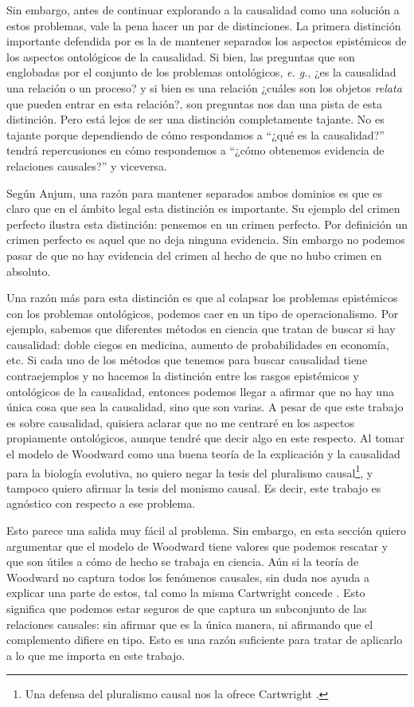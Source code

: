 Sin embargo, antes de continuar explorando a la causalidad como una solución a estos problemas, vale la pena hacer un par de distinciones. La primera distinción importante defendida por \cite{Anjum2018} es la de mantener separados los aspectos epistémicos de los aspectos ontológicos de la causalidad. Si bien, las preguntas que son englobadas por el conjunto de los problemas ontológicos, \textit{e. g.}, ¿es la causalidad una relación o un proceso? y si bien es una relación ¿cuáles son los objetos \textit{relata} que pueden entrar en esta relación?, son preguntas nos dan una pista de esta distinción. Pero está lejos de ser una distinción completamente tajante. No es tajante porque dependiendo de cómo respondamos a ``¿qué es la causalidad?'' tendrá repercusiones en cómo respondemos a ``¿cómo obtenemos evidencia de relaciones causales?'' y viceversa.

Según Anjum, una razón para mantener separados ambos dominios es que es claro que en el ámbito legal esta distinción es importante. Su ejemplo del crimen perfecto ilustra esta distinción: pensemos en un crimen perfecto. Por definición un crimen perfecto es aquel que no deja ninguna evidencia. Sin embargo no podemos pasar de que no hay evidencia del crimen al hecho de que no hubo crimen en absoluto.

Una razón más para esta distinción es que al colapsar los problemas epistémicos con los problemas ontológicos, podemos caer en un tipo de operacionalismo. Por ejemplo, sabemos que diferentes métodos en ciencia que tratan de buscar si hay causalidad: doble ciegos en medicina, aumento de probabilidades en economía, etc. Si cada uno de los métodos que tenemos para buscar causalidad tiene contraejemplos y no hacemos la distinción entre los rasgos epistémicos y ontológicos de la causalidad, entonces podemos llegar a afirmar que no hay una única cosa que sea la causalidad, sino que son varias. A pesar de que este trabajo es sobre causalidad, quisiera aclarar que no me centraré en los aspectos propiamente ontológicos, aunque tendré que decir algo en este respecto. Al tomar el modelo de Woodward como una buena teoría de la explicación y la causalidad para la biología evolutiva, no quiero negar la tesis del pluralismo causal\footnote{Una defensa del pluralismo causal nos la ofrece Cartwright \citeyear{Cartwright2007}.}, y tampoco quiero afirmar la tesis del monismo causal. Es decir, este trabajo es agnóstico con respecto a ese problema.

Esto parece una salida muy fácil al problema. Sin embargo, en esta sección quiero argumentar que el modelo de Woodward tiene valores que podemos rescatar y que son útiles a cómo de hecho se trabaja en ciencia. Aún si la teoría de Woodward no captura todos los fenómenos causales, sin duda nos ayuda a explicar una parte de estos, tal como la misma Cartwright concede \citeyear[cap. 7]{Cartwright2007}. Esto significa que podemos estar seguros de que captura un subconjunto de las relaciones causales: sin afirmar que es la única manera, ni afirmando que el complemento difiere en tipo. Esto es una razón suficiente para tratar de aplicarlo a lo que me importa en este trabajo.

